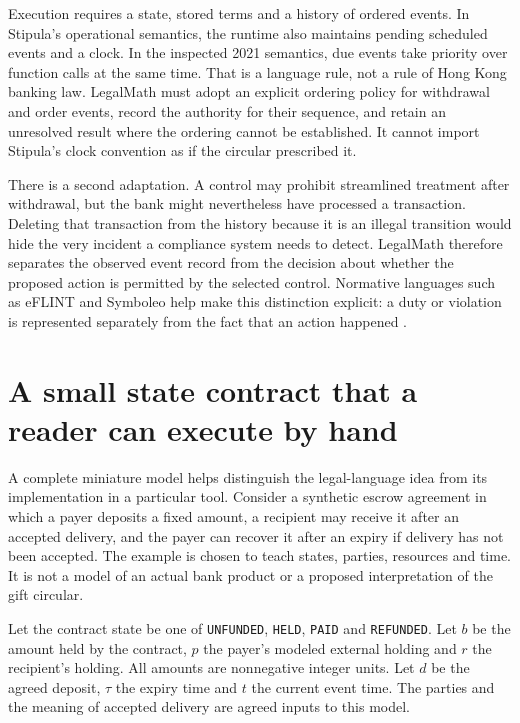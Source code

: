 Execution requires a state, stored terms and a history of ordered events. In
Stipula's operational semantics, the runtime also maintains pending scheduled
events and a clock. In the inspected 2021 semantics, due events take priority
over function calls at the same time. That is a language rule, not a rule of
Hong Kong banking law. LegalMath must adopt an explicit ordering policy for
withdrawal and order events, record the authority for their sequence, and retain
an unresolved result where the ordering cannot be established. It cannot import
Stipula's clock convention as if the circular prescribed it.

There is a second adaptation. A control may prohibit streamlined treatment after
withdrawal, but the bank might nevertheless have processed a transaction.
Deleting that transaction from the history because it is an illegal transition
would hide the very incident a compliance system needs to detect. LegalMath
therefore separates the observed event record from the decision about whether
the proposed action is permitted by the selected control. Normative languages
such as eFLINT and Symboleo help make this distinction explicit: a duty or
violation is represented separately from the fact that an action happened
\citep{eflint2020,symboleo2020}.

\section{A small state contract that a reader can execute by hand}
\label{merge:M04:06}


A complete miniature model helps distinguish the legal-language idea from its
implementation in a particular tool. Consider a synthetic escrow agreement in
which a payer deposits a fixed amount, a recipient may receive it after an
accepted delivery, and the payer can recover it after an expiry if delivery has
not been accepted. The example is chosen to teach states, parties, resources and
time. It is not a model of an actual bank product or a proposed interpretation of
the gift circular.

Let the contract state be one of \texttt{UNFUNDED}, \texttt{HELD},
\texttt{PAID} and \texttt{REFUNDED}. Let $b$ be the amount held by the contract,
$p$ the payer's modeled external holding and $r$ the recipient's holding. All
amounts are nonnegative integer units. Let $d$ be the agreed deposit, $\tau$ the
expiry time and $t$ the current event time. The parties and the meaning of
accepted delivery are agreed inputs to this model.

